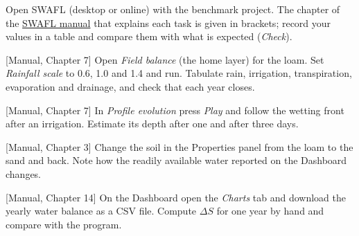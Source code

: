 {\small Open SWAFL (desktop or online) with the benchmark project. The chapter of the \href{https://github.com/halilunaziru73-creator/Coupled-Water-Fluxes-Pore-Scale-Dynamics-Precision-Irrigation-Mulching-Feedback-Loops/raw/main/Software/v1.1.0/SWAFL_Desktop/docs/manual_v1.1.0/SWAFL_Manual_v1.1.0.pdf}{SWAFL manual} that explains each task is given in brackets; record your values in a table and compare them with what is expected (\emph{Check}).}\par\vspace{3pt}
\begin{exlist}
\item {\color{khblue}[Manual, Chapter 7]} Open \emph{Field balance} (the home layer) for the loam. Set \emph{Rainfall scale} to 0.6, 1.0 and 1.4 and run. Tabulate rain, irrigation, transpiration, evaporation and drainage, and check that each year closes.\par{}
\item {\color{khblue}[Manual, Chapter 7]} In \emph{Profile evolution} press \emph{Play} and follow the wetting front after an irrigation. Estimate its depth after one and after three days.\par{}
\item {\color{khblue}[Manual, Chapter 3]} Change the soil in the Properties panel from the loam to the sand and back. Note how the readily available water reported on the Dashboard changes.\par{}
\item {\color{khblue}[Manual, Chapter 14]} On the Dashboard open the \emph{Charts} tab and download the yearly water balance as a CSV file. Compute $\Delta S$ for one year by hand and compare with the program.\par{}
\end{exlist}
